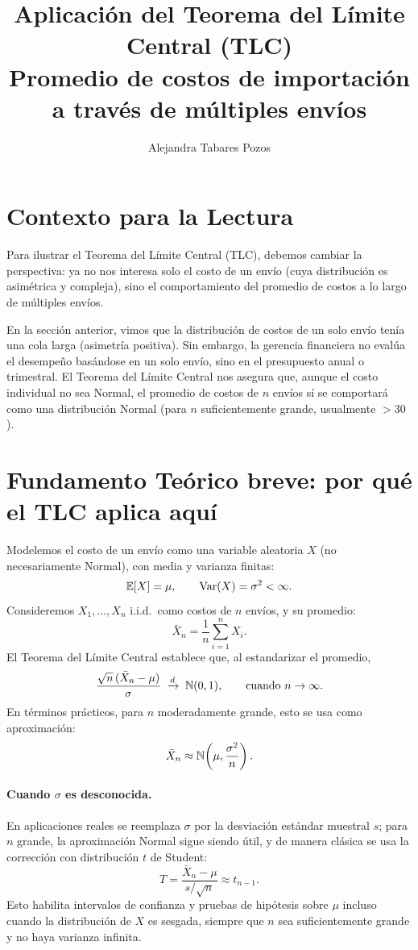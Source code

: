 \documentclass[11pt, letterpaper]{article}
\title{Aplicación del Teorema del Límite Central (TLC)\\
Promedio de costos de importación a través de múltiples envíos}
\author{Alejandra Tabares Pozos}
\date{}
\begin{document}
\maketitle
\tableofcontents
\newpage

\section{Contexto para la Lectura}
Para ilustrar el Teorema del Límite Central (TLC), debemos cambiar la perspectiva:
ya no nos interesa solo el costo de un envío (cuya distribución es asimétrica y compleja),
sino el comportamiento del promedio de costos a lo largo de múltiples envíos.

En la sección anterior, vimos que la distribución de costos de un solo envío tenía una cola larga (asimetría positiva).
Sin embargo, la gerencia financiera no evalúa el desempeño basándose en un solo envío, sino en el presupuesto anual o trimestral.
El Teorema del Límite Central nos asegura que, aunque el costo individual no sea Normal, el promedio de costos de $n$ envíos
sí se comportará como una distribución Normal (para $n$ suficientemente grande, usualmente $>30$).

\section{Fundamento Teórico breve: por qué el TLC aplica aquí}
Modelemos el costo de un envío como una variable aleatoria $X$ (no necesariamente Normal), con media y varianza finitas:
\[
\mathbb{E}[X]=\mu,\qquad \operatorname{Var}(X)=\sigma^2<\infty.
\]
Consideremos $X_1,\dots,X_n$ i.i.d.\ como costos de $n$ envíos, y su promedio:
\[
\bar X_n=\frac{1}{n}\sum_{i=1}^n X_i.
\]
El Teorema del Límite Central establece que, al estandarizar el promedio,
\[
\frac{\sqrt{n}\,(\bar X_n-\mu)}{\sigma}\;\xrightarrow{d}\;\mathbb{N}(0,1),
\qquad \text{cuando } n\to\infty.
\]
En términos prácticos, para $n$ moderadamente grande, esto se usa como aproximación:
\[
\bar X_n \approx \mathbb{N}\!\left(\mu,\frac{\sigma^2}{n}\right).
\]
\paragraph{Cuando $\sigma$ es desconocida.}
En aplicaciones reales se reemplaza $\sigma$ por la desviación estándar muestral $s$; para $n$ grande, la aproximación Normal sigue siendo útil,
y de manera clásica se usa la corrección con distribución $t$ de Student:
\[
T=\frac{\bar X_n-\mu}{s/\sqrt{n}} \approx t_{n-1}.
\]
Esto habilita intervalos de confianza y pruebas de hipótesis sobre $\mu$ incluso cuando la distribución de $X$ es sesgada, siempre que $n$ sea suficientemente grande
y no haya varianza infinita.
\end{document}
